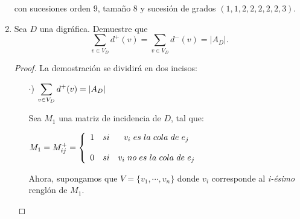 \documentclass{article}
\begin{document}
\begin{enumerate}
  \begin{figure}[ht!]
    \centering
  \end{figure}
  
  con sucesiones orden $9$, tamaño $8$ y sucesión de grados $(1,1,2,2,2,2,2,3)$.
\item Sea $D$ una digr\'afica.   Demuestre que
  $$\sum_{v \in V_D} d^+(v) = \sum_{v \in V_D} d^-(v) = |A_D|.$$
  
  \renewcommand\qedsymbol{QED}
  \begin{proof}
    La demostración se dividirá en dos incisos:  
    \begin{itemize}
    \item[$\cdot$)] $\displaystyle \sum_{v \in V_{D}} d^{+}(v) = \abs{A_{D}}$ 
      
      Sea $M_{1}$ una matriz de incidencia de $D$, tal que:
      \begin{center}
        $M_{1} = M^{+}_{ij}
        = \left \{ 
        \begin{array}{lcc}
          1 &   si  & v_{i} \hspace{0.3em} es \hspace{0.3em} la
          \hspace{0.3em} cola \hspace{0.3em} de \hspace{0.3em} e_{j} \\
          \\0 &  si & v_{i} \hspace{0.3em} no \hspace{0.3em} es \hspace{0.3em}
          la \hspace{0.3em} cola \hspace{0.3em} de \hspace{0.3em} e_{j}
        \end{array}
        \right.$
      \end{center}
      Ahora, supongamos que $V = \{v_{1}, \dotsm, v_{n}\}$ donde $v_{i}$
      corresponde al \textit{i-ésimo} renglón de $M_{1}$.
      

\end{itemize}
\end{proof}
\end{enumerate}
\end{document}
